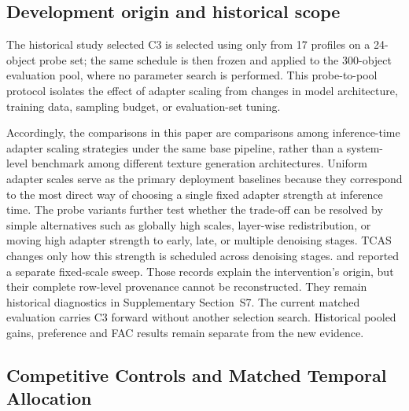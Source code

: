 \documentclass[times,twocolumn,final]{elsarticle}
\providecommand{\DIFadd}[1]{{\protect\color{blue} \sf #1}} %
\providecommand{\DIFdel}[1]{{\protect\color{red} \scriptsize #1}} %
\providecommand{\DIFaddbegin}{} %
\providecommand{\DIFaddend}{} %
\providecommand{\DIFdelbegin}{} %
\providecommand{\DIFdelend}{} %
\begin{document}
\subsection{Development origin and historical scope}
\label{subsec:c3}
\DIFadd{The historical study selected }\DIFaddend C3 \DIFdelbegin \DIFdel{is selected using only }\DIFdelend \DIFaddbegin \DIFadd{from 17 profiles on }\DIFaddend a 24-object probe \DIFdelbegin \DIFdel{set; the same schedule is then frozen and applied to the 300-object evaluation pool, where no parameter search is performed. This probe-to-pool protocol isolates the effect of adapter scaling from changes in model architecture, training data, sampling budget, or evaluation-set tuning. }%

\DIFdel{Accordingly, the comparisons in this paper are comparisons among inference-time adapter scaling strategies under the same base pipeline, rather than a system-level benchmark among different texture generation architectures.
Uniform adapter scales serve as the primary deployment baselines because they correspond to the most direct way of choosing a single fixed adapter strength at inference time. The probe variants further test whether the trade-off can be resolved by simple alternatives such as globally high scales, layer-wise redistribution, or moving high adapter strength to early, late, or multiple denoising stages. TCAS changes only how this strength is scheduled across denoising stages.
}\DIFdelend \DIFaddbegin \DIFadd{and reported a separate fixed-scale sweep. Those records explain the intervention's origin, but their complete row-level provenance cannot be reconstructed. They remain historical diagnostics in Supplementary Section~S7. The current matched evaluation carries C3 forward without another selection search. Historical pooled gains, preference and FAC results remain separate from the new evidence.
}\DIFaddend 

\DIFdelbegin %
\DIFdelend \DIFaddbegin \subsection{Competitive Controls and Matched Temporal Allocation}
\label{subsec:largescale}
\DIFaddend 
\end{document}
